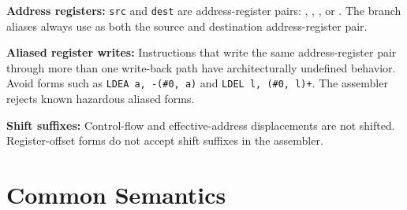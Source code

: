 \noindent\textbf{Address registers:} \texttt{src} and \texttt{dest} are address-register pairs: , ,
, or . The branch aliases always use  as both the source and destination address-register pair.

\noindent\textbf{Aliased register writes:} Instructions that write the same address-register pair through more than one
write-back path have architecturally undefined behavior. Avoid forms such as \texttt{LDEA a, -(\#0, a)} and
\texttt{LDEL l, (\#0, l)+}. The assembler rejects known hazardous aliased forms.

\noindent\textbf{Shift suffixes:} Control-flow and effective-address displacements are not shifted. Register-offset
forms do not accept shift suffixes in the assembler.

\section{Common Semantics}

